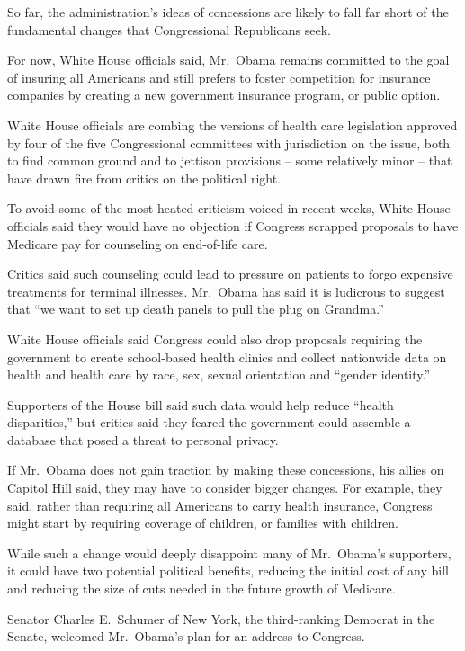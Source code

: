 ﻿\documentclass[12pt]{article}
\begin{document}
So far, the administration's ideas of concessions are likely to fall far short of the fundamental
changes that Congressional Republicans seek.

For now, White House officials said, Mr.~Obama remains committed to the goal of insuring all
Americans and still prefers to foster competition for insurance companies by creating a new
government insurance program, or public option.

White House officials are combing the versions of health care legislation approved by four of the
five Congressional committees with jurisdiction on the issue, both to find common ground and to
jettison provisions -- some relatively minor -- that have drawn fire from critics on the political
right.

To avoid some of the most heated criticism voiced in recent weeks, White House officials said they
would have no objection if Congress scrapped proposals to have Medicare pay for counseling on
end-of-life care.

Critics said such counseling could lead to pressure on patients to forgo expensive treatments for
terminal illnesses. Mr.~Obama has said it is ludicrous to suggest that ``we want to set up death
panels to pull the plug on Grandma.''

White House officials said Congress could also drop proposals requiring the government to create
school-based health clinics and collect nationwide data on health and health care by race, sex,
sexual orientation and ``gender identity.''

Supporters of the House bill said such data would help reduce ``health disparities,'' but critics
said they feared the government could assemble a database that posed a threat to personal privacy.

If Mr.~Obama does not gain traction by making these concessions, his allies on Capitol Hill said,
they may have to consider bigger changes. For example, they said, rather than requiring all
Americans to carry health insurance, Congress might start by requiring coverage of children, or
families with children.

While such a change would deeply disappoint many of Mr.~Obama's supporters, it could have two
potential political benefits, reducing the initial cost of any bill and reducing the size of cuts
needed in the future growth of Medicare.

Senator Charles E.~Schumer of New York, the third-ranking Democrat in the Senate, welcomed
Mr.~Obama's plan for an address to Congress.
\end{document}
